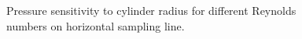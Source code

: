 \documentclass{aiaa-pretty}
\begin{document}
\begin{figure}[H]
	\quad
	\caption{Pressure sensitivity to cylinder radius for different Reynolds numbers on horizontal sampling line.}
	\label{fig:cylinderPressureSensitivity}
\end{figure}
%
\end{document}
